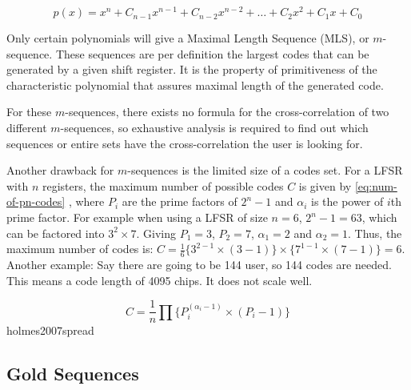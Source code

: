 		\begin{equation}
			\label{eq:lfsr-polynomial}
			p(x) = x^n + C_{n-1} x^{n-1}  + C_{n-2} x^{n-2} + \dotsc + C_{2} x^{2}  + C_{1} x  + C_{0}
		\end{equation}


		Only certain polynomials will give a Maximal Length Sequence (MLS), or $m$-sequence.
		These sequences are per definition the largest codes that can be generated by a given shift register.
		It is the property of primitiveness of the characteristic polynomial that assures maximal length of the generated code. 


		For these $m$-sequences, there exists no formula for the cross-correlation of two different $m$-sequences, so exhaustive analysis is required to find out which sequences or entire sets have the cross-correlation the user is looking for.

		Another drawback for $m$-sequences is the limited size of a codes set.
		For a LFSR with $n$ registers, the maximum number of possible codes $C$ is given by \autoref{eq:num-of-pn-codes} \cite{mutagi1996pseudo}, where $P_i$ are the prime factors of $2^n - 1$ and $\alpha_i$ is the power of $i$th prime factor.
		For example when using a LFSR of size $n = 6$, $2^n - 1 = 63$, which can be factored into $3^2 \times 7$.
		Giving $P_1 = 3$, $P_2 = 7$, $\alpha_1 = 2$ and $\alpha_2 = 1$.
		Thus, the maximum number of codes is: $C = \frac{1}{6} \{ 3^{2 - 1} \times (3 - 1) \} \times \{ 7^{1 - 1} \times (7 - 1) \} = 6$.
		Another example: Say there are going to be 144 user, so 144 codes are needed. 
		This means a code length of 4095 chips.
		It does not scale well.

		\begin{equation}
			\label{eq:num-of-pn-codes}
			C = \frac{1}{n} \prod \{ P_{i} ^ {(\alpha_i - 1)} \times (P_i - 1) \}
		\end{equation}
holmes2007spread
	\subsection{Gold Sequences}
	\label{subsec:gold-theory}

